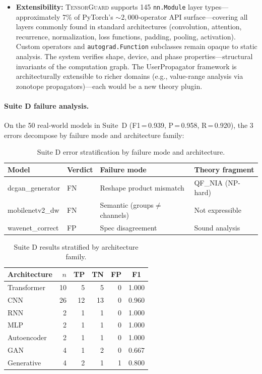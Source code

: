 \documentclass[11pt]{article}
\begin{document}
\begin{itemize}[leftmargin=2em]
    BDD-based state representation or partial-order reduction
    could reduce this penalty.
  \item \textbf{Extensibility:} \textsc{TensorGuard}
    supports 145 \texttt{nn.Module} layer types---approximately 7\% of
    PyTorch's ${\sim}2{,}000$-operator API surface---covering all layers
    commonly found in standard architectures (convolution, attention,
    recurrence, normalization, loss functions, padding, pooling, activation).
    Custom operators and \texttt{autograd.Function} subclasses remain opaque
    to static analysis. The system verifies shape, device, and phase
    properties---structural invariants of the computation graph.
    The UserPropagator framework is architecturally extensible
    to richer domains (e.g., value-range analysis via zonotope
    propagators)---each would be a new theory plugin.
\end{itemize}

\paragraph{Suite D failure analysis.}
On the 50 real-world models in Suite~D (F1\,=\,0.939,
P\,=\,0.958, R\,=\,0.920), the 3 errors decompose by failure mode
and architecture family:

\begin{table}[h]
\centering
\caption{Suite D error stratification by failure mode and architecture.}
\label{tab:suite-d-errors}
\small
\begin{tabular}{@{}llll@{}}
\toprule
\textbf{Model} & \textbf{Verdict} & \textbf{Failure mode} & \textbf{Theory fragment} \\
\midrule
dcgan\_generator & FN & Reshape product mismatch & QF\_NIA (NP-hard) \\
mobilenetv2\_dw & FN & Semantic (groups$\neq$channels) & Not expressible \\
wavenet\_correct & FP & Spec disagreement & Sound analysis \\
\bottomrule
\end{tabular}
\end{table}

\begin{table}[h]
\centering
\caption{Suite D results stratified by architecture family.}
\label{tab:suite-d-arch}
\small
\begin{tabular}{@{}lrrrrc@{}}
\toprule
\textbf{Architecture} & \textbf{$n$} & \textbf{TP} & \textbf{TN} &
\textbf{FP} & \textbf{F1} \\
\midrule
Transformer & 10 & 5 & 5 & 0 & 1.000 \\
CNN         & 26 & 12 & 13 & 0 & 0.960 \\
RNN         &  2 & 1 & 1 & 0 & 1.000 \\
MLP         &  2 & 1 & 1 & 0 & 1.000 \\
Autoencoder &  2 & 1 & 1 & 0 & 1.000 \\
GAN         &  4 & 1 & 2 & 0 & 0.667 \\
Generative  &  4 & 2 & 1 & 1 & 0.800 \\
\bottomrule
\end{tabular}
\end{table}
\end{document}
